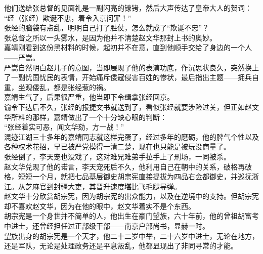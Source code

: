 \begin{multicols}{\theparacolNo}
他们送给张总督的见面礼是一副闪亮的镣铐，然后大声传达了皇帝大人的贺词：\\

“经（张经）欺诞不忠，着令入京问罪！”\\

张经的脑袋有点乱，明明自己打了胜仗，怎么就成了“欺诞不忠”？\\

张总督之所以一头雾水，是因为他并不清楚赵文华那封上书的奥妙。\\

嘉靖刚看到这份黑材料的时候，起初并不在意，直到他顺手交给了身边的一个人——严嵩。\\

严嵩自然明白赵儿子的意图，当即展现了他的表演功底，作沉思状良久，突然换上了一副忧国忧民的表情，开始痛斥倭寇侵害百姓的惨状，最后指出主题——拥兵自重，坐观倭乱，都是张经惹的祸。\\

嘉靖生气了，后果很严重，他当即下令缉拿张经回京。\\

谕令下达后不久，张经的报捷文书就送到了，看似张经就要涉险过关，但正如赵文华所料的那样，嘉靖做出了一个十分缺心眼的判断：\\

“张经着实可恶，闻文华劾，方一战！”\\

混迹江湖三十多年的嘉靖同志就这样完蛋了，经过多年的磨砺，他的脾气个性以及各种权术花招，早已被严党摸得一清二楚，现在也只能是被玩没商量了。\\

张经倒了，李天宠也没戏了，这对难兄难弟手拉手上了刑场，一同被杀。\\

赵文华兑现了他的诺言，李天宠死后不久，他利用自己在朝中的关系，破格再破格，短短一个月，就把七品基层御史胡宗宪直接提拔为四品右佥都御史，并巡抚浙江。从芝麻官到封疆大吏，其晋升速度堪比飞毛腿导弹。\\

赵文华十分欣赏胡宗宪，因为胡宗宪的出众能力，以及在逆境中的支持。但胡宗宪却不喜欢赵文华，因为在他的眼中，赵文华着实不是个东西。\\

胡宗宪是一个身世并不简单的人，他出生在豪门望族，六十年前，他的曾祖胡富考中进士，还曾经担任过正部级干部——南京户部尚书，显赫一时。\\

望族出身的胡宗宪是一个天才，他二十二岁中举，二十六岁中进士，无论在地方，还是军队，无论是处理政务还是平息叛乱，他都显现出了非同寻常的才能。\\


\end{multicols}
